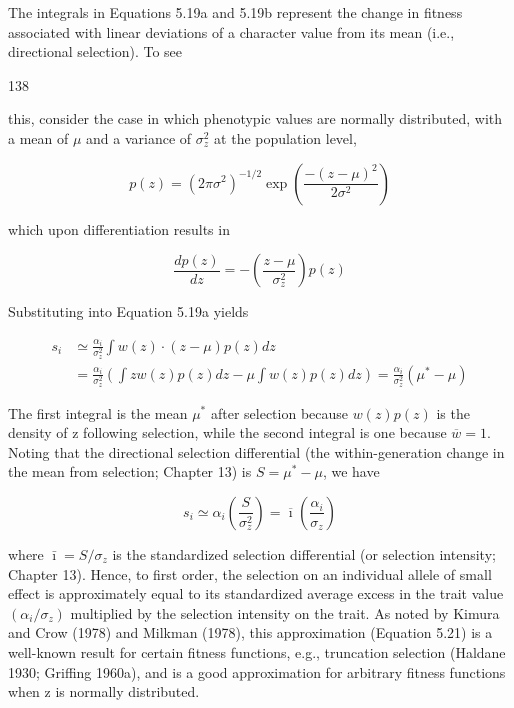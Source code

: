 \documentclass{article}
\begin{document}
The integrals in Equations 5.19a and 5.19b represent the change in fitness associated with linear deviations of a character value from its mean (i.e., directional selection). To see

138

this, consider the case in which phenotypic values are normally distributed, with a mean of  $ \mu $ and a variance of  $ \sigma_{z}^{2} $ at the population level,

\begin{equation}
p(z)=\left(2\pi\sigma^{2}\right)^{-1/2}\exp\left(\frac{-(z-\mu)^{2}}{2\sigma^{2}}\right)
\tag{5.20a}
\label{eq:5_20a}
\end{equation}

which upon differentiation results in

\begin{equation}
\frac{dp(z)}{dz}=-\left(\frac{z-\mu}{\sigma_{z}^{2}}\right)p(z)
\tag{5.20b}
\label{eq:5_20b}
\end{equation}

Substituting into Equation 5.19a yields

\begin{equation}
\begin{align*}s_{i}&\simeq\frac{\alpha_{i}}{\sigma_{z}^{2}}\int w(z)\cdot(z-\mu)p(z)dz\\&=\frac{\alpha_{i}}{\sigma_{z}^{2}}\left(\int z w(z)p(z)dz-\mu\int w(z)p(z)dz\right)=\frac{\alpha_{i}}{\sigma_{z}^{2}}\left(\mu^{*}-\mu\right)\end{align*}
\tag{5.20c}
\label{eq:5_20c}
\end{equation}

The first integral is the mean  $ \mu^* $ after selection because  $ w(z)p(z) $ is the density of z following selection, while the second integral is one because  $ \overline{w} = 1 $. Noting that the directional selection differential (the within-generation change in the mean from selection; Chapter 13) is  $ S = \mu^* - \mu $, we have

\begin{equation}
s_{i}\simeq\alpha_{i}\left(\frac{S}{\sigma_{z}^{2}}\right)=\overline{\imath}\left(\frac{\alpha_{i}}{\sigma_{z}}\right)
\tag{5.21}
\label{eq:5_21}
\end{equation}

where  $ \bar{\imath} = S/\sigma_z $ is the standardized selection differential (or selection intensity; Chapter 13). Hence, to first order, the selection on an individual allele of small effect is approximately equal to its standardized average excess in the trait value  $ (\alpha_i/\sigma_z) $ multiplied by the selection intensity on the trait. As noted by Kimura and Crow (1978) and Milkman (1978), this approximation (Equation 5.21) is a well-known result for certain fitness functions, e.g., truncation selection (Haldane 1930; Griffing 1960a), and is a good approximation for arbitrary fitness functions when z is normally distributed.
\end{document}
